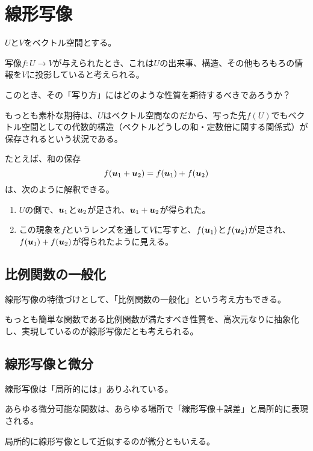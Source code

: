 \documentclass[../../../topic_linear-algebra]{subfiles}
\begin{document}
\sectionline
\section{線形写像}

$U$と$V$をベクトル空間とする。

写像$f \colon U \to V$が与えられたとき、これは$U$の出来事、構造、その他もろもろの情報を$V$に投影していると考えられる。

\br

このとき、その「写り方」にはどのような性質を期待するべきであろうか？

もっとも素朴な期待は、$U$はベクトル空間なのだから、写った先$f(U)$でもベクトル空間としての代数的構造（ベクトルどうしの和・定数倍に関する関係式）が保存されるという状況である。

\begin{mindflow}
\end{mindflow}

たとえば、和の保存
\begin{equation*}
  f(\vb*{u}_1 + \vb*{u}_2) = f(\vb*{u}_1) + f(\vb*{u}_2)
\end{equation*}
は、次のように解釈できる。

\begin{enumerate}
  \item $U$の側で、$\vb*{u}_1$と$\vb*{u}_2$が足され、$\vb*{u}_1 + \vb*{u}_2$が得られた。
  \item この現象を$f$というレンズを通して$V$に写すと、$f(\vb*{u}_1)$と$f(\vb*{u}_2)$が足され、$f(\vb*{u}_1) + f(\vb*{u}_2)$が得られたように見える。
\end{enumerate}

\subsection{比例関数の一般化}

線形写像の特徴づけとして、「比例関数の一般化」という考え方もできる。

もっとも簡単な関数である比例関数が満たすべき性質を、高次元なりに抽象化し、実現しているのが線形写像だとも考えられる。

\subsection{線形写像と微分}

線形写像は「局所的には」ありふれている。

あらゆる微分可能な関数は、あらゆる場所で「線形写像＋誤差」と局所的に表現される。

局所的に線形写像として近似するのが微分ともいえる。
\end{document}
